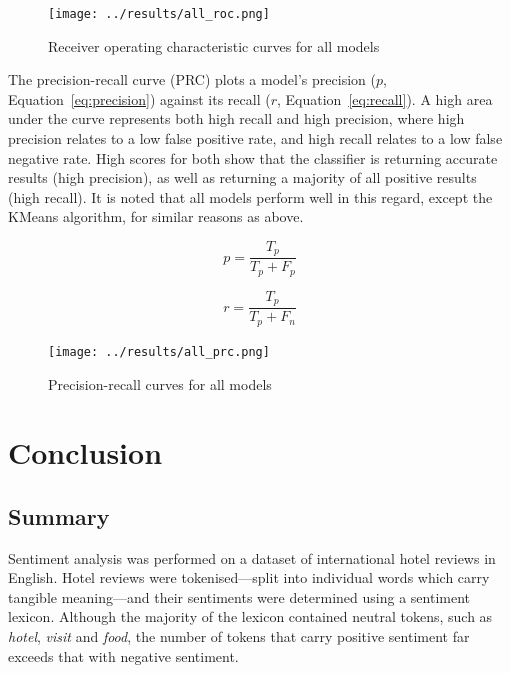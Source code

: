 \documentclass[11pt, a4paper]{pancake-article}
\begin{document}
\begin{figure}
  \begin{center}
    \texttt{[image: ../results/all\_roc.png]}
  \end{center}
  \caption{Receiver operating characteristic curves for all models}\label{fig:roc-all}
\end{figure}

The precision-recall curve (PRC) plots a model's precision ($p$, Equation~\ref{eq:precision})
against its recall ($r$, Equation~\ref{eq:recall}). A high area under the curve represents both high recall and high precision, where high precision relates to a low false positive rate, and high recall relates to a low false negative rate. High scores for both show that the classifier is returning accurate results (high precision), as well as returning a majority of all positive results (high recall). It is noted that all models perform well in this regard,
except the KMeans algorithm, for similar reasons as above.

\begin{equation}
  p = \frac{T_p}{T_p + F_p}
  \label{eq:precision}
\end{equation}

\begin{equation}
  r = \frac{T_p}{T_p + F_n} 
  \label{eq:recall}
\end{equation}

\begin{figure}
  \begin{center}
    \texttt{[image: ../results/all\_prc.png]}
  \end{center}
  \caption{Precision-recall curves for all models}\label{fig:prc-all}
\end{figure}

\section{Conclusion}

\subsection{Summary}

Sentiment analysis was performed on a dataset of international hotel reviews
in English. Hotel reviews were tokenised---split into individual words which
carry tangible meaning---and their sentiments were determined using a sentiment
lexicon. Although the majority of the lexicon contained neutral tokens,
such as \textit{hotel}, \textit{visit} and \textit{food}, the number of tokens
that carry positive sentiment far exceeds that with negative sentiment.
\end{document}
